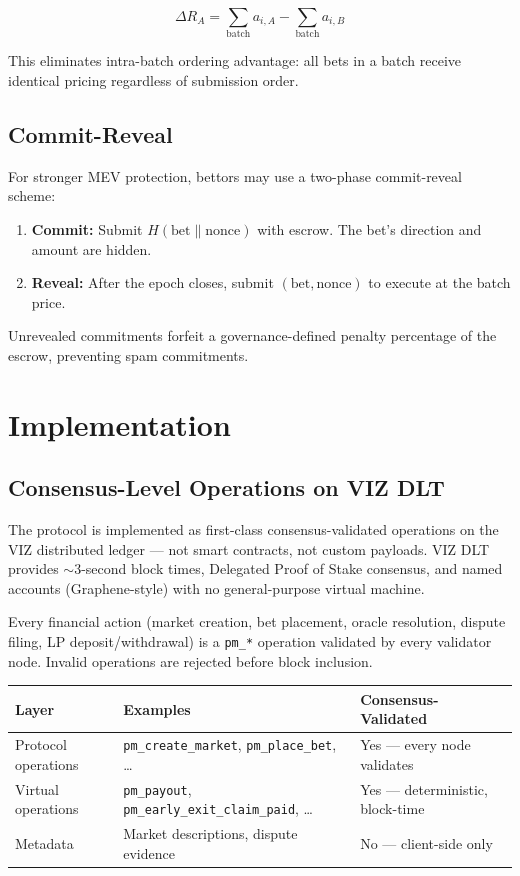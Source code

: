 \documentclass{ledger}
\theoremstyle{plain}
\theoremstyle{remark}
\begin{document}
\[
\Delta R_A = \sum_{\text{batch}} a_{i,A} - \sum_{\text{batch}} a_{i,B}
\]

This eliminates intra-batch ordering advantage: all bets in a batch receive
identical pricing regardless of submission order.

\subsection{Commit-Reveal}

For stronger MEV protection, bettors may use a two-phase commit-reveal scheme:

\begin{enumerate}
  \item \textbf{Commit:} Submit $H(\text{bet} \| \text{nonce})$ with escrow. The
  bet's direction and amount are hidden.
  \item \textbf{Reveal:} After the epoch closes, submit $(\text{bet},
  \text{nonce})$ to execute at the batch price.
\end{enumerate}

Unrevealed commitments forfeit a governance-defined penalty percentage of the
escrow, preventing spam commitments.

\section{Implementation}\label{sec:impl}

\subsection{Consensus-Level Operations on VIZ DLT}

The protocol is implemented as first-class consensus-validated operations on the
VIZ distributed ledger --- not smart contracts, not custom payloads. VIZ DLT
provides ${\sim}3$-second block times, Delegated Proof of Stake consensus, and
named accounts (Graphene-style) with no general-purpose virtual machine.

Every financial action (market creation, bet placement, oracle resolution,
dispute filing, LP deposit/withdrawal) is a \texttt{pm\_*} operation validated by
every validator node. Invalid operations are rejected before block inclusion.

\begin{center}
\begin{tabular}{lll}
\hline
\textbf{Layer} & \textbf{Examples} & \textbf{Consensus-Validated} \\
\hline
Protocol operations & \texttt{pm\_create\_market}, \texttt{pm\_place\_bet}, \ldots & Yes --- every node validates \\
Virtual operations & \texttt{pm\_payout}, \texttt{pm\_early\_exit\_claim\_paid}, \ldots & Yes --- deterministic, block-time \\
Metadata & Market descriptions, dispute evidence & No --- client-side only \\
\hline
\end{tabular}
\end{center}
\end{document}
